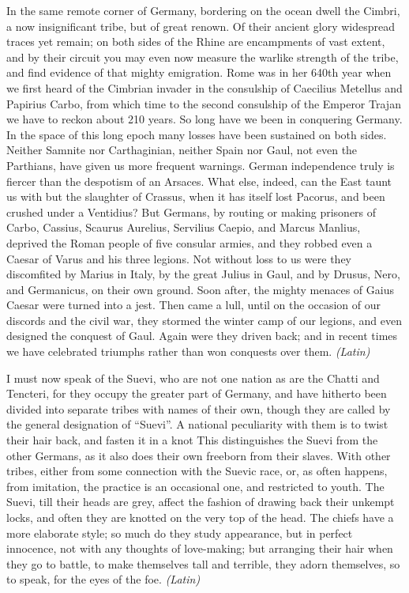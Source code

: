 In the same remote corner of Germany, bordering on the ocean dwell the Cimbri, a now insignificant tribe, but of great renown. Of their ancient glory widespread traces yet remain; on both sides of the Rhine are encampments of vast extent, and by their circuit you may even now measure the warlike strength of the tribe, and find evidence of that mighty emigration. Rome was in her 640th year when we first heard of the Cimbrian invader in the consulship of Caecilius Metellus and Papirius Carbo, from which time to the second consulship of the Emperor Trajan we have to reckon about 210 years. So long have we been in conquering Germany. In the space of this long epoch many losses have been sustained on both sides. Neither Samnite nor Carthaginian, neither Spain nor Gaul, not even the Parthians, have given us more frequent warnings. German independence truly is fiercer than the despotism of an Arsaces. What else, indeed, can the East taunt us with but the slaughter of Crassus, when it has itself lost Pacorus, and been crushed under a Ventidius? But Germans, by routing or making prisoners of Carbo, Cassius, Scaurus Aurelius, Servilius Caepio, and Marcus Manlius, deprived the Roman people of five consular armies, and they robbed even a Caesar of Varus and his three legions. Not without loss to us were they discomfited by Marius in Italy, by the great Julius in Gaul, and by Drusus, Nero, and Germanicus, on their own ground. Soon after, the mighty menaces of Gaius Caesar were turned into a jest. Then came a lull, until on the occasion of our discords and the civil war, they stormed the winter camp of our legions, and even designed the conquest of Gaul. Again were they driven back; and in recent times we have celebrated triumphs rather than won conquests over them. \emph{(Latin)}


I must now speak of the Suevi, who are not one nation as are the Chatti and Tencteri, for they occupy the greater part of Germany, and have hitherto been divided into separate tribes with names of their own, though they are called by the general designation of ``Suevi''. A national peculiarity with them is to twist their hair back, and fasten it in a knot This distinguishes the Suevi from the other Germans, as it also does their own freeborn from their slaves. With other tribes, either from some connection with the Suevic race, or, as often happens, from imitation, the practice is an occasional one, and restricted to youth. The Suevi, till their heads are grey, affect the fashion of drawing back their unkempt locks, and often they are knotted on the very top of the head. The chiefs have a more elaborate style; so much do they study appearance, but in perfect innocence, not with any thoughts of love-making; but arranging their hair when they go to battle, to make themselves tall and terrible, they adorn themselves, so to speak, for the eyes of the foe. \emph{(Latin)}

